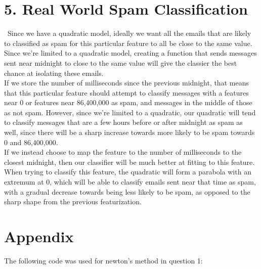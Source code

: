 \documentclass{article}
\begin{document}
\newpage
\section*{5. Real World Spam Classification}

\quad \, Since we have a quadratic model, ideally we want all the emails that are likely to classified as spam for this particular feature to all be close to the same value. Since we're limited to a quadratic model, creating a function that sends messages sent near midnight to close to the same value will give the classier the best chance at isolating these emails.\\

If we store the number of milliseconds since the previous midnight, that means that this particular feature should attempt to classify messages with a features near 0 or features near 86,400,000 as spam, and messages in the middle of those as not spam. However, since we're limited to a quadratic, our quadratic will tend to classify messages that are a few hours before or after midnight as spam as well, since there will be a sharp increase towards more likely to be spam towards 0 and 86,400,000.\\

If we instead choose to map the feature to the number of milliseconds to the closest midnight, then our classifier will be much better at fitting to this feature. When trying to classify this feature, the quadratic will form a parabola with an extremum at $0$, which will be able to classify emails sent near that time as spam, with a gradual decrease towards being less likely to be spam, as opposed to the sharp shape from the previous featurization.

\newpage
\section*{Appendix}
The following code was used for newton's method in question 1:
\end{document}
